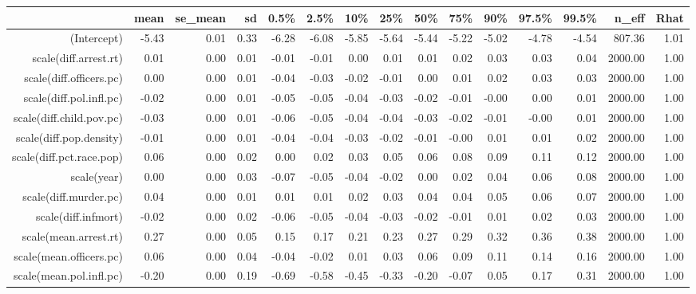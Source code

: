 \begin{table}[ht]
\centering
\begin{tabular}{rrrrrrrrrrrrrrr}
  \hline
 & mean & se\_mean & sd & 0.5\% & 2.5\% & 10\% & 25\% & 50\% & 75\% & 90\% & 97.5\% & 99.5\% & n\_eff & Rhat \\ 
  \hline
(Intercept) & -5.43 & 0.01 & 0.33 & -6.28 & -6.08 & -5.85 & -5.64 & -5.44 & -5.22 & -5.02 & -4.78 & -4.54 & 807.36 & 1.01 \\ 
  scale(diff.arrest.rt) & 0.01 & 0.00 & 0.01 & -0.01 & -0.01 & 0.00 & 0.01 & 0.01 & 0.02 & 0.03 & 0.03 & 0.04 & 2000.00 & 1.00 \\ 
  scale(diff.officers.pc) & 0.00 & 0.00 & 0.01 & -0.04 & -0.03 & -0.02 & -0.01 & 0.00 & 0.01 & 0.02 & 0.03 & 0.03 & 2000.00 & 1.00 \\ 
  scale(diff.pol.infl.pc) & -0.02 & 0.00 & 0.01 & -0.05 & -0.05 & -0.04 & -0.03 & -0.02 & -0.01 & -0.00 & 0.00 & 0.01 & 2000.00 & 1.00 \\ 
  scale(diff.child.pov.pc) & -0.03 & 0.00 & 0.01 & -0.06 & -0.05 & -0.04 & -0.04 & -0.03 & -0.02 & -0.01 & -0.00 & 0.01 & 2000.00 & 1.00 \\ 
  scale(diff.pop.density) & -0.01 & 0.00 & 0.01 & -0.04 & -0.04 & -0.03 & -0.02 & -0.01 & -0.00 & 0.01 & 0.01 & 0.02 & 2000.00 & 1.00 \\ 
  scale(diff.pct.race.pop) & 0.06 & 0.00 & 0.02 & 0.00 & 0.02 & 0.03 & 0.05 & 0.06 & 0.08 & 0.09 & 0.11 & 0.12 & 2000.00 & 1.00 \\ 
  scale(year) & 0.00 & 0.00 & 0.03 & -0.07 & -0.05 & -0.04 & -0.02 & 0.00 & 0.02 & 0.04 & 0.06 & 0.08 & 2000.00 & 1.00 \\ 
  scale(diff.murder.pc) & 0.04 & 0.00 & 0.01 & 0.01 & 0.01 & 0.02 & 0.03 & 0.04 & 0.04 & 0.05 & 0.06 & 0.07 & 2000.00 & 1.00 \\ 
  scale(diff.infmort) & -0.02 & 0.00 & 0.02 & -0.06 & -0.05 & -0.04 & -0.03 & -0.02 & -0.01 & 0.01 & 0.02 & 0.03 & 2000.00 & 1.00 \\ 
  scale(mean.arrest.rt) & 0.27 & 0.00 & 0.05 & 0.15 & 0.17 & 0.21 & 0.23 & 0.27 & 0.29 & 0.32 & 0.36 & 0.38 & 2000.00 & 1.00 \\ 
  scale(mean.officers.pc) & 0.06 & 0.00 & 0.04 & -0.04 & -0.02 & 0.01 & 0.03 & 0.06 & 0.09 & 0.11 & 0.14 & 0.16 & 2000.00 & 1.00 \\ 
  scale(mean.pol.infl.pc) & -0.20 & 0.00 & 0.19 & -0.69 & -0.58 & -0.45 & -0.33 & -0.20 & -0.07 & 0.05 & 0.17 & 0.31 & 2000.00 & 1.00 \\ 

\end{tabular}
\end{table}
